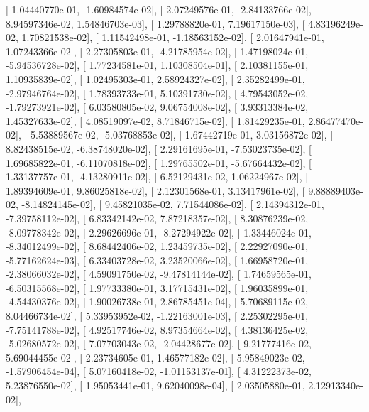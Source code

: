 \documentclass{article}
\begin{document}
       [  1.04440770e-01,  -1.60984574e-02],
       [  2.07249576e-01,  -2.84133766e-02],
       [  8.94597346e-02,   1.54846703e-03],
       [  1.29788820e-01,   7.19617150e-03],
       [  4.83196249e-02,   1.70821538e-02],
       [  1.11542498e-01,  -1.18563152e-02],
       [  2.01647941e-01,   1.07243366e-02],
       [  2.27305803e-01,  -4.21785954e-02],
       [  1.47198024e-01,  -5.94536728e-02],
       [  1.77234581e-01,   1.10308504e-01],
       [  2.10381155e-01,   1.10935839e-02],
       [  1.02495303e-01,   2.58924327e-02],
       [  2.35282499e-01,  -2.97946764e-02],
       [  1.78393733e-01,   5.10391730e-02],
       [  4.79543052e-02,  -1.79273921e-02],
       [  6.03580805e-02,   9.06754008e-02],
       [  3.93313384e-02,   1.45327633e-02],
       [  4.08519097e-02,   8.71846715e-02],
       [  1.81429235e-01,   2.86477470e-02],
       [  5.53889567e-02,  -5.03768853e-02],
       [  1.67442719e-01,   3.03156872e-02],
       [  8.82438515e-02,  -6.38748020e-02],
       [  2.29161695e-01,  -7.53023735e-02],
       [  1.69685822e-01,  -6.11070818e-02],
       [  1.29765502e-01,  -5.67664432e-02],
       [  1.33137757e-01,  -4.13280911e-02],
       [  6.52129431e-02,   1.06224967e-02],
       [  1.89394609e-01,   9.86025818e-02],
       [  2.12301568e-01,   3.13417961e-02],
       [  9.88889403e-02,  -8.14824145e-02],
       [  9.45821035e-02,   7.71544086e-02],
       [  2.14394312e-01,  -7.39758112e-02],
       [  6.83342142e-02,   7.87218357e-02],
       [  8.30876239e-02,  -8.09778342e-02],
       [  2.29626696e-01,  -8.27294922e-02],
       [  1.33446024e-01,  -8.34012499e-02],
       [  8.68442406e-02,   1.23459735e-02],
       [  2.22927090e-01,  -5.77162624e-03],
       [  6.33403728e-02,   3.23520066e-02],
       [  1.66958720e-01,  -2.38066032e-02],
       [  4.59091750e-02,  -9.47814144e-02],
       [  1.74659565e-01,  -6.50315568e-02],
       [  1.97733380e-01,   3.17715431e-02],
       [  1.96035899e-01,  -4.54430376e-02],
       [  1.90026738e-01,   2.86785451e-04],
       [  5.70689115e-02,   8.04466734e-02],
       [  5.33953952e-02,  -1.22163001e-03],
       [  2.25302295e-01,  -7.75141788e-02],
       [  4.92517746e-02,   8.97354664e-02],
       [  4.38136425e-02,  -5.02680572e-02],
       [  7.07703043e-02,  -2.04428677e-02],
       [  9.21777416e-02,   5.69044455e-02],
       [  2.23734605e-01,   1.46577182e-02],
       [  5.95849023e-02,  -1.57906454e-04],
       [  5.07160418e-02,  -1.01153137e-01],
       [  4.31222373e-02,   5.23876550e-02],
       [  1.95053441e-01,   9.62040098e-04],
       [  2.03505880e-01,   2.12913340e-02],
\end{document}
